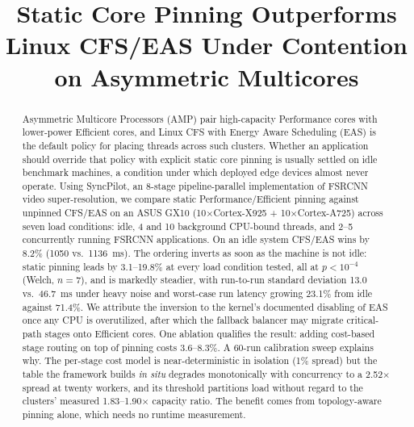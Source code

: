 \documentclass[conference]{IEEEtran}
\begin{document}
\title{Static Core Pinning Outperforms Linux CFS/EAS Under Contention on Asymmetric Multicores
}

\author{


}
\maketitle

\begin{abstract}
Asymmetric Multicore Processors (AMP) pair high-capacity Performance cores with lower-power Efficient cores, and Linux CFS with Energy Aware Scheduling (EAS) is the default policy for placing threads across such clusters. Whether an application should override that policy with explicit static core pinning is usually settled on idle benchmark machines, a condition under which deployed edge devices almost never operate. Using SyncPilot, an 8-stage pipeline-parallel implementation of FSRCNN video super-resolution, we compare static Performance/Efficient pinning against unpinned CFS/EAS on an ASUS GX10 (10$\times$Cortex-X925 + 10$\times$Cortex-A725) across seven load conditions: idle, 4 and 10 background CPU-bound threads, and 2--5 concurrently running FSRCNN applications. On an idle system CFS/EAS wins by 8.2\% (1050 vs.\ 1136~ms). The ordering inverts as soon as the machine is not idle: static pinning leads by 3.1--19.8\% at every load condition tested, all at $p<10^{-4}$ (Welch, $n=7$), and is markedly steadier, with run-to-run standard deviation 13.0 vs.\ 46.7~ms under heavy noise and worst-case run latency growing 23.1\% from idle against 71.4\%. We attribute the inversion to the kernel's documented disabling of EAS once any CPU is overutilized, after which the fallback balancer may migrate critical-path stages onto Efficient cores. One ablation qualifies the result: adding cost-based stage routing on top of pinning costs 3.6--8.3\%. A 60-run calibration sweep explains why. The per-stage cost model is near-deterministic in isolation (1\% spread) but the table the framework builds \emph{in situ} degrades monotonically with concurrency to a 2.52$\times$ spread at twenty workers, and its threshold partitions load without regard to the clusters' measured 1.83--1.90$\times$ capacity ratio. The benefit comes from topology-aware pinning alone, which needs no runtime measurement.
\end{abstract}
\end{document}
